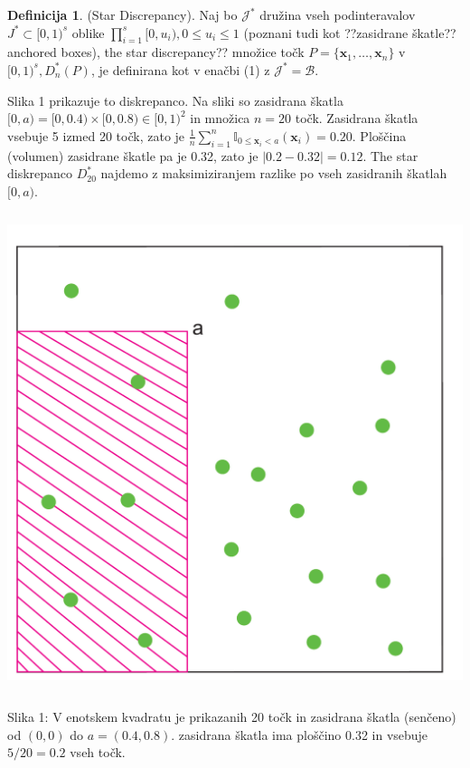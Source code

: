 \documentclass[12pt,a4paper, reqno]{amsart}
\theoremstyle{definition} %
\newtheorem{definicija}{Definicija}[section]
\theoremstyle{plain} %
\begin{document}
\begin{definicija}{(Star Discrepancy)}. Naj bo $\mathcal{J}^*$ družina vseh podinteravalov $J^*\subset [0,1)^s$ oblike $\prod\limits_{i=1}^s [0,u_i), 0 \leq u_i \leq 1$ (poznani tudi kot ??zasidrane škatle?? anchored boxes), the star discrepancy?? množice točk $P=\{\boldsymbol x_1, \ldots, \boldsymbol x_n \}$ v $[0,1)^s, D^*_n(P)$, je definirana kot v enačbi (1) z $\mathcal{J}^* = \mathcal{B}$.
\end{definicija}

Slika 1 prikazuje to diskrepanco. Na sliki so zasidrana škatla $[0,a) = [0,0.4) \times [0,0.8) \in [0,1)^2$ in množica $n=20$ točk. Zasidrana škatla vsebuje 5 izmed 20 točk, zato je $\frac{1}{n}\sum_{i = 1}^n \mathbb {I}_{0\leq \boldsymbol{x}_i<a} (\boldsymbol x_i)=0.20$. Ploščina (volumen) zasidrane škatle pa je 0.32, zato je $|0.2 - 0.32|=0.12$. The star diskrepanco $D_{20}^*$ najdemo z maksimiziranjem razlike po vseh zasidranih škatlah $[0,a)$.

\includegraphics [width=14cm, height=14cm]{discrepancy.pdf}
\vspace{3mm}

\noindent Slika 1: V enotskem kvadratu je prikazanih 20 točk in zasidrana škatla (senčeno) od $(0,0)$ do $a = (0.4,0.8)$. zasidrana škatla ima ploščino 0.32 in vsebuje $5/20 = 0.2$ vseh točk. 
\end{document}
